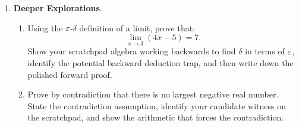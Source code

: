 \begin{enumerate}
  \item \textbf{Deeper Explorations}.
  \begin{enumerate}
    \item Using the $\varepsilon$-$\delta$ definition of a limit, prove that:
    \[
    \lim_{x \to 3} (4x - 5) = 7.
    \]
    Show your scratchpad algebra working backwards to find $\delta$ in terms of $\varepsilon$, identify the potential backward deduction trap, and then write down the polished forward proof.
    \item Prove by contradiction that there is no largest negative real number. State the contradiction assumption, identify your candidate witness on the scratchpad, and show the arithmetic that forces the contradiction.
  \end{enumerate}
\end{enumerate}

\newpage
